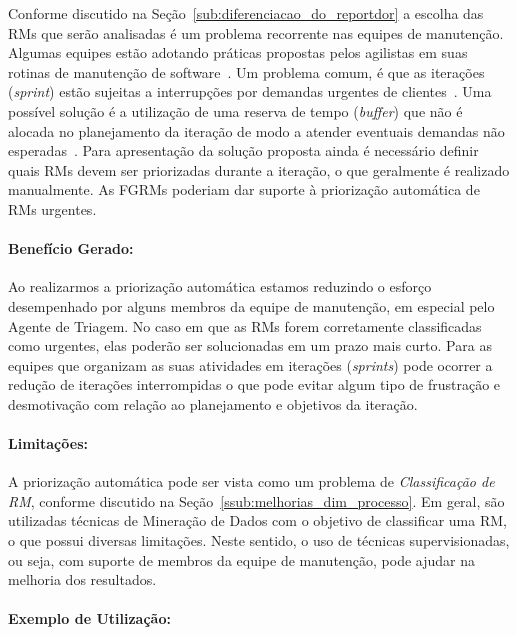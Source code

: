 Conforme discutido na Seção~\ref{sub:diferenciacao_do_reportdor} a escolha das
RMs que serão analisadas é um problema recorrente nas equipes de manutenção.
Algumas equipes estão adotando práticas propostas pelos agilistas em suas
rotinas de manutenção de software~\cite{svensson2005introducing}. Um problema
comum, é que as iterações (\textit{sprint}) estão sujeitas a interrupções por
demandas urgentes de clientes~\cite{bennett2000software}. Uma possível solução
é a utilização de uma reserva de tempo (\textit{buffer}) que não é alocada no
planejamento da iteração de modo a atender eventuais demandas não
esperadas~\cite{schwaber2002agile}. Para apresentação da solução proposta ainda
é necessário definir quais RMs devem ser priorizadas durante a iteração, o que
geralmente é realizado manualmente. As FGRMs poderiam dar suporte à priorização
automática de RMs urgentes.

\paragraph{Benefício Gerado:}\label{par:papéis_afetados_s07}

Ao realizarmos a priorização automática estamos reduzindo o esforço desempenhado
por alguns membros da equipe de manutenção, em especial pelo Agente de Triagem.
No caso em que as RMs forem corretamente classificadas como urgentes, elas
poderão ser solucionadas em um prazo mais curto. Para as equipes que organizam
as suas atividades em iterações (\textit{sprints}) pode ocorrer a redução de
iterações interrompidas o que pode evitar algum tipo de frustração e
desmotivação com relação ao planejamento e objetivos da iteração.

\paragraph{Limitações:}
\label{par:limitacoes_s07}

A priorização automática pode ser vista como um problema de
\textit{Classificação de RM}, conforme discutido na
Seção~\ref{ssub:melhorias_dim_processo}. Em geral, são utilizadas técnicas de
Mineração de Dados com o objetivo de classificar uma RM, o que possui diversas
limitações. Neste sentido, o uso de técnicas supervisionadas, ou seja, com
suporte de membros da equipe de manutenção, pode ajudar na melhoria dos
resultados.

\paragraph{Exemplo de Utilização:}
\label{par:exemplo_de_utilização_s07}

